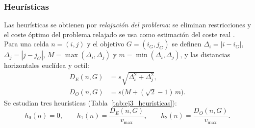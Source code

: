 %
%
%
%



\subsubsection{Heurísticas}
\label{sec:ej3_heuristicas}

Las heurísticas se obtienen por \emph{relajación del problema}: se eliminan
restricciones y el coste óptimo del problema relajado se usa como
estimación del coste real \cite{russell2022}. Para una celda $n = (i,j)$ y el
objetivo $G = (i_G, j_G)$ se definen
$\Delta_i = |i - i_G|$, $\Delta_j = |j - j_G|$,
$M = \max(\Delta_i, \Delta_j)$ y $m = \min(\Delta_i, \Delta_j)$, y las
distancias horizontales euclídea y octil:
\begin{align}
  D_E(n, G) &= s\sqrt{\Delta_i^2 + \Delta_j^2}, \label{eq:ej3_de}\\
  D_O(n, G) &= s\big(M + (\sqrt{2} - 1)\,m\big). \label{eq:ej3_do}
\end{align}
Se estudian tres heurísticas (Tabla~\ref{tab:ej3_heuristicas}):
\begin{equation}
  h_0(n) = 0, \qquad
  h_1(n) = \frac{D_E(n, G)}{v_{\max}}, \qquad
  h_2(n) = \frac{D_O(n, G)}{v_{\max}}.
  \label{eq:ej3_h}
\end{equation}

